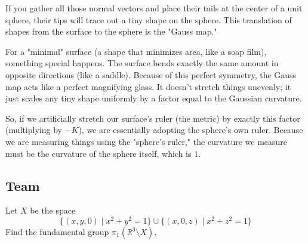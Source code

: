 \begin{solution}
If you gather all those normal vectors and place their tails at the center of a unit sphere, their tips will trace out a tiny shape on the sphere. This translation of shapes from the surface to the sphere is the "Gauss map."

For a "minimal" surface (a shape that minimizes area, like a soap film), something special happens. The surface bends exactly the same amount in opposite directions (like a saddle). Because of this perfect symmetry, the Gauss map acts like a perfect magnifying glass. It doesn't stretch things unevenly; it just scales any tiny shape uniformly by a factor equal to the Gaussian curvature.

So, if we artificially stretch our surface's ruler (the metric) by exactly this factor (multiplying by $-K$), we are essentially adopting the sphere's own ruler. Because we are measuring things using the "sphere's ruler," the curvature we measure must be the curvature of the sphere itself, which is $1$.
\end{solution}

\subsection{Team}

\begin{exercise}
\label{geometry:2013:7}
Let $X$ be the space
\[
\{(x, y, 0) \mid x^2 + y^2 = 1\} \cup \{(x, 0, z) \mid x^2 + z^2 = 1\}
\]
Find the fundamental group $\pi_1(\mathbb{R}^3 \setminus X)$.
\end{exercise}


